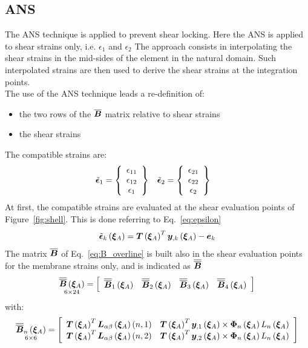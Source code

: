 \subsection{ANS}
The ANS technique is applied to prevent shear locking. Here the ANS is applied to shear strains only, i.e. $\epsilon_{1}$ and  $\epsilon_{2}$ The approach consists in interpolating the shear strains in the mid-sides of the element in the natural domain. Such interpolated strains are then used to derive the shear strains at the integration points.\\
The use of the ANS technique leads a re-definition of:
\begin{itemize}
	\item the two rows of the $\overline{\T{B}}$ matrix relative to shear strains
	\item the shear strains
\end{itemize}
The compatible strains are:
\begin{align}
\tilde{\T{\epsilon}}_1 & =
\cubr{\vvect{c}{
\epsilon_{11} \\
\epsilon_{12} \\
\epsilon_{1}
}}
&
\tilde{\T{\epsilon}}_2 & =
\cubr{\vvect{c}{
\epsilon_{21} \\
\epsilon_{22} \\
\epsilon_{2}
}}
\end{align}
At first, the compatible strains are evaluated at the shear evaluation points of Figure~\ref{fig:shell}. This is done referring to Eq.~\ref{eq:epsilon}
\begin{equation}
\tilde{\T{\epsilon}}_k \valxiA  =
\T{T} \valxiA ^T \T{y}_{,k} \valxiA - \T{e}_k
\end{equation}
The matrix $\overline{\T{B}}$ of Eq.~\ref{eq:B_overline} is built also in the shear evaluation points for the membrane strains only, and is indicated as $\overline{\overline{\T{B}}}$
\begin{equation}
\underset{ 6 \times 24 }{\overline{\overline{\T{B}}} \valxiA} =
\sqbr{ \matr{ c c c c  }{
\overline{\overline{\T{B}}}_1 \valxiA & \overline{\overline{\T{B}}}_2 \valxiA & \overline{\overline{\T{B}}}_3 \valxiA & \overline{\overline{\T{B}}}_4 \valxiA
}}
\end{equation}
with:
\begin{equation}
\underset{ 6 \times 6 }{\overline{\overline{\T{B}}}_n \valxiA} =
\sqbr{ \matr{ c c  }{
\T{T} \valxiA ^ T \T{L}_{\alpha \beta} \valxiA \plbr{n,1} & \T{T} \valxiA^T \T{y}_{,1} \valxiA \times \T{\Phi}_{n} \valxiA L_{n}  \valxiA \\
\T{T} \valxiA ^ T \T{L}_{\alpha \beta} \valxiA \plbr{n,2} & \T{T} \valxiA^T \T{y}_{,2} \valxiA \times \T{\Phi}_{n} \valxiA L_{n}  \valxiA
}}
\end{equation}
